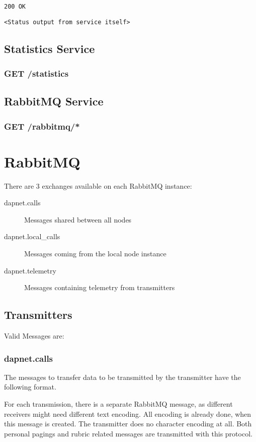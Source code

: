 \texttt{200 OK}
\begin{lstlisting}
<Status output from service itself>
\end{lstlisting}


\subsection{Statistics Service}

\subsubsection{GET /statistics}


\subsection{RabbitMQ Service}

\subsubsection{GET /rabbitmq/*}


\section{RabbitMQ}
\label{protocoldef:RabbitMQ}
There are 3 exchanges available on each RabbitMQ instance:
\begin{description}
\item[dapnet.calls] Messages shared between all nodes
\item[dapnet.local\_calls] Messages coming from the local node instance
\item[dapnet.telemetry] Messages containing telemetry from transmitters
\end{description}


\subsection{Transmitters}
\label{protocoldef:RabbitMQ:Transmitters}

Valid Messages are:

\subsubsection{dapnet.calls}
\label{protocoldef:RabbitMQ:dapnet.calls}
The messages to transfer data to be transmitted by the transmitter have the
following format.

For each transmission, there is a separate RabbitMQ message, as different
receivers might need different text encoding. All encoding is already done, when
this message is created. The transmitter does no character encoding at all. Both
personal pagings and rubric related messages are transmitted with this protocol.

